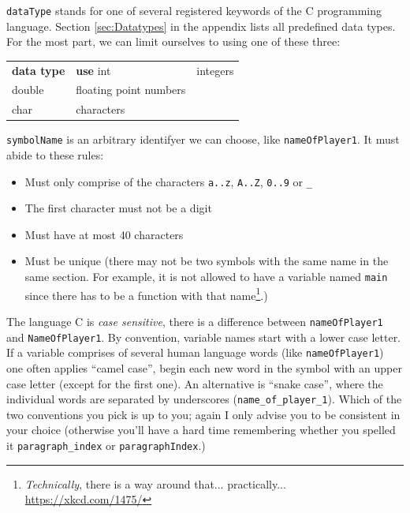 \texttt{dataType} stands for one of several registered keywords of the C programming language. Section \ref{sec:Datatypes} in the appendix lists all predefined data types. For the most part, we can limit ourselves to using one of these three:
\begin{center}

\begin{tabularx}
	{.5505\linewidth}
	{TU}
\toprule[1.5pt]
	\textbf{\textrm{data type}} & \textbf{use} \tabcrlf
	int                         & integers \\
	double                      & floating point numbers \\
	char                        & characters \\
\bottomrule[1.5pt]
\end{tabularx}
\end{center}

\texttt{symbolName} is an arbitrary identifyer we can choose, like \texttt{nameOfPlayer1}. It must abide to these rules: \vspace{-9pt}
\begin{itemize}
\setlength\itemsep{0pt}
\item Must only comprise of the characters \texttt{a..z}, \texttt{A..Z}, \texttt{0..9} or \texttt{\_}
\item The first character must not be a digit
\item Must have at most 40 characters
\item Must be unique (there may not be two symbols with the same name in the same section. For example, it is not allowed to have a variable named \texttt{main} 
	since there has to be a function with that name\footnote{\emph{Technically}, there is a way around that... practically... \url{https://xkcd.com/1475/}}.)
\end{itemize}
\vspace{-8pt}

The language C is \emph{case sensitive}, \ie there is a difference between \texttt{nameOfPlayer1} and \texttt{NameOfPlayer1}. By convention, variable names start with a lower case letter. If a variable comprises of several human language words (like \texttt{nameOfPlayer1}) one often applies \enquote{camel case}, \ie begin each new word in the symbol with an upper case letter (except for the first one). An alternative is \enquote{snake case}, where the individual words are separated by underscores (\texttt{name\_of\_player\_1}). Which of the two conventions you pick is up to you; again I only advise you to be consistent in your choice (otherwise you'll have a hard time remembering whether you spelled it \texttt{paragraph\_index} or \texttt{paragraphIndex}.)

